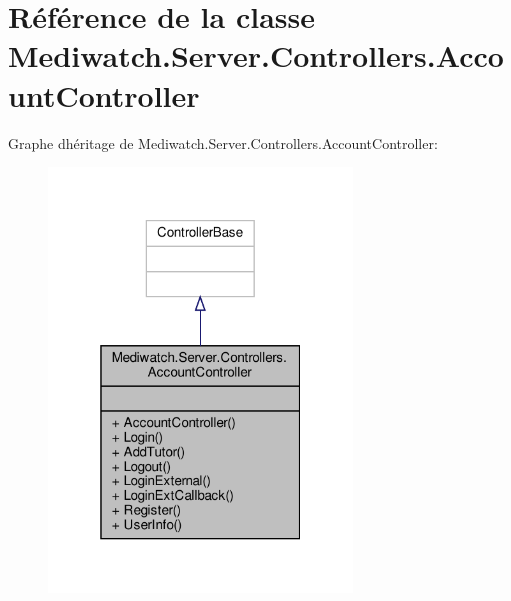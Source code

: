 \hypertarget{class_mediwatch_1_1_server_1_1_controllers_1_1_account_controller}{}\section{Référence de la classe Mediwatch.\+Server.\+Controllers.\+Account\+Controller}
\label{class_mediwatch_1_1_server_1_1_controllers_1_1_account_controller}


Graphe d\textquotesingle{}héritage de Mediwatch.\+Server.\+Controllers.\+Account\+Controller\+:\nopagebreak
\begin{figure}[H]
\begin{center}
\leavevmode
\includegraphics[width=229pt]{class_mediwatch_1_1_server_1_1_controllers_1_1_account_controller__inherit__graph}
\end{center}
\end{figure}


